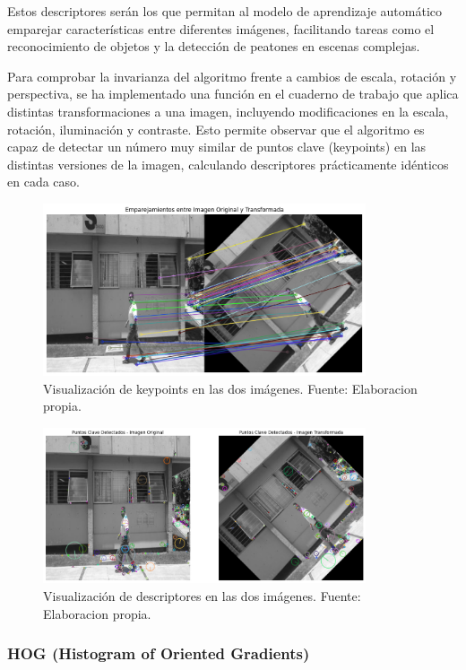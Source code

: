 \documentclass[a4paper]{article}
\begin{document}
Estos descriptores serán los que permitan al modelo de aprendizaje automático emparejar características entre diferentes imágenes, facilitando tareas como el reconocimiento de objetos y la detección de peatones en escenas complejas.

Para comprobar la invarianza del algoritmo frente a cambios de escala, rotación y perspectiva, se ha implementado una función en el cuaderno de trabajo que aplica distintas transformaciones a una imagen, incluyendo modificaciones en la escala, rotación, iluminación y contraste. Esto permite observar que el algoritmo es capaz de detectar un número muy similar de puntos clave (keypoints) en las distintas versiones de la imagen, calculando descriptores prácticamente idénticos en cada caso.

\begin{figure}[H]
    \centering
    \includegraphics[width=0.85\textwidth]{images/sift_inv.png}
    \caption{Visualización de keypoints en las dos imágenes. Fuente: Elaboracion propia.}
\end{figure}

\begin{figure}[H]
    \centering
    \includegraphics[width=0.85\textwidth]{images/sift_inv_des.png}
    \caption{Visualización de descriptores en las dos imágenes. Fuente: Elaboracion propia.}
\end{figure}


\subsubsection{HOG (Histogram of Oriented Gradients)}
\end{document}
